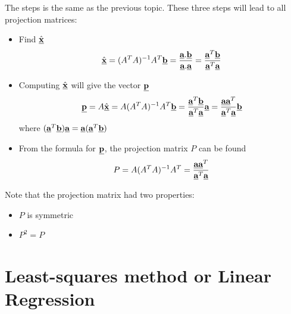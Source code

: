 \documentclass[10pt,a4paper]{article}
\begin{document}
The steps is the same as the previous topic.
These three steps will lead to all projection matrices: 
\begin{itemize}
    \item Find $\hat{\textbf{\underline{x}}}$
    \begin{align*}
        \hat{\textbf{\underline{x}}} = (A^T A)^{-1}A^T \textbf{\underline{b}} = \frac{\textbf{\underline{a}}.\textbf{\underline{b}}}{\textbf{\underline{a}}.\textbf{\underline{a}}} = \frac{\textbf{\underline{a}}^T \textbf{\underline{b}}}{\textbf{\underline{a}}^T \textbf{\underline{a}}}
    \end{align*}
    \item Computing $\hat{\textbf{\underline{x}}}$ will give the vector $\textbf{\underline{p}}$
    \begin{align*}
        \textbf{\underline{p}} = A\hat{\textbf{\underline{x}}} = A(A^T A)^{-1}A^T \textbf{\underline{b}} = \frac{\textbf{\underline{a}}^T \textbf{\underline{b}}}{\textbf{\underline{a}}^T \textbf{\underline{a}}} \textbf{\underline{a}} = \frac{\textbf{\underline{a}} \textbf{\underline{a}}^T}{\textbf{\underline{a}}^T \textbf{\underline{a}}} \textbf{\underline{b}} 
    \end{align*}
    where $(\textbf{\underline{a}}^T \textbf{\underline{b}})\textbf{\underline{a}}=\textbf{\underline{a}}(\textbf{\underline{a}}^T\textbf{\underline{b}})$
    \item From the formula for $\textbf{\underline{p}}$, the projection matrix $P$ can be found
    \begin{align*}
        P = A(A^T A)^{-1} A^T = \frac{\textbf{\underline{a}} \textbf{\underline{a}}^T}{\textbf{\underline{a}}^T \textbf{\underline{a}}}
    \end{align*}
\end{itemize}

\pagebreak

Note that the projection matrix had two properties:
\begin{itemize}
    \item $P$ is symmetric
    \item $P^2 = P$
\end{itemize}

\pagebreak

\section{Least-squares method or Linear Regression}
\end{document}
